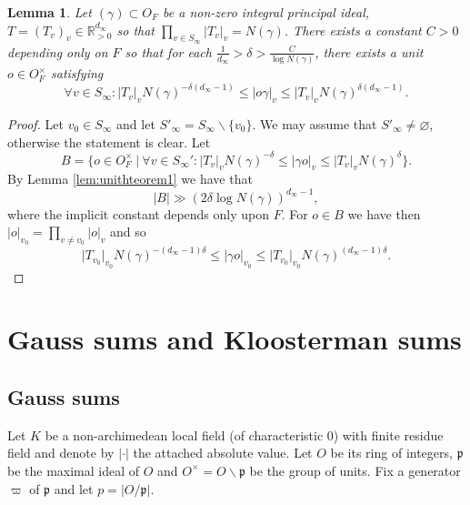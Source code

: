 \documentclass[a4paper,11pt]{amsart}
\newtheorem{lemma}[theorem]{Lemma}
\theoremstyle{definition}
\newcommand{\R}{\mathbb{R}}
\begin{document}
\begin{lemma}\label{lem:choicegenerator}
    Let $(\gamma) \subset O_F$ be a non-zero integral principal ideal, $T=(T_v)_v \in \R_{>0}^{d_{\infty}}$ so that $\prod_{v\in S_{\infty}}\vert{T_v}\vert_v = N(\gamma)$. There exists a constant $C>0$ depending only on $F$ so that for each $\frac{1}{d_{\infty}}>\delta > \frac{C}{\log N(\gamma)}$, there exists a unit $o\in O_F^{\times}$ satisfying 
    \[\forall v \in S_{\infty}: \vert{T_v}\vert_vN(\gamma)^{-\delta(d_{\infty}-1)}\leq \vert{o\gamma}\vert_v \leq \vert{T_v}\vert_vN(\gamma)^{\delta(d_{\infty}-1)}.  \]
\end{lemma}
\begin{proof} Let $v_0 \in S_{\infty}$ and let $S'_{\infty} = S_{\infty}\smallsetminus\{v_0\}$. We may assume that $S'_{\infty} \neq \varnothing$, otherwise the statement is clear.
 Let \[B = \{o \in O_F^{\times}\ | \  \forall v \in S_{\infty}' : \vert{T_v}\vert_vN(\gamma)^{-{\delta}} \leq \vert{\gamma o}\vert_v \leq \vert{T_v}\vert_vN(\gamma)^{\delta}\}. \]
 By Lemma \ref{lem:unithteorem1} we have that
 \[\vert{B}\vert \gg (2\delta\log N(\gamma))^{d_{\infty}-1}, \]
 where the implicit constant depends only upon $F$. 
 For $o\in B$ we have then $\vert{o}\vert_{v_0} = \prod_{v\neq v_0}\vert{o}\vert_ v$ and so \[\vert{T_{v_0}}\vert_{v_0} N(\gamma)^{-(d_{\infty}-1)\delta} \leq \vert{\gamma o}\vert_{v_0} \leq \vert{T_{v_0}}\vert_{v_0}N(\gamma)^{(d_{\infty}-1)\delta}.\]
 
\end{proof}


























\section{Gauss sums and Kloosterman sums}\label{sec:gausskloosterman}

\subsection{Gauss sums}
Let $K$ be a non-archimedean local field (of characteristic $0$) with finite residue field and denote by $\vert \cdot \vert$ the attached absolute value. Let $O$ be its ring of integers, $\mathfrak{p}$ be the maximal ideal of $O$ and $O^{\times} = O\smallsetminus\mathfrak{p}$ be the group of units. Fix a generator $\varpi$ of $\mathfrak{p}$ and let $p = \vert O/\mathfrak{p}\vert$.
\end{document}
